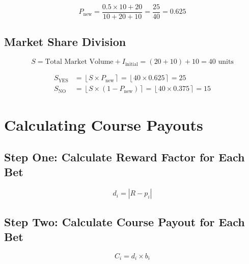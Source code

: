 \documentclass{article}
\begin{document}
\[
P_{\text{new}} = \frac{0.5 \times 10 + 20}{10 + 20 + 10} = \frac{25}{40} = 0.625
\]

\subsection*{Market Share Division}

\[
S = \text{Total Market Volume} + I_{\text{initial}} = (20 + 10) + 10 = 40 \text{ units}
\]

\begin{align*}
S_{\text{YES}} &= \left\lfloor S \times P_{\text{new}} \right\rceil = \left\lfloor 40 \times 0.625 \right\rceil = 25 \\
S_{\text{NO}} &= \left\lfloor S \times (1 - P_{\text{new}}) \right\rceil = \left\lfloor 40 \times 0.375 \right\rceil = 15
\end{align*}

\begin{center}
\end{center}

\section*{Calculating Course Payouts}


\subsection*{Step One: Calculate Reward Factor for Each Bet}

\[
d_i = |R - p_i|
\]

\subsection*{Step Two: Calculate Course Payout for Each Bet}

\[
C_i = d_i \times b_i
\]
\end{document}
